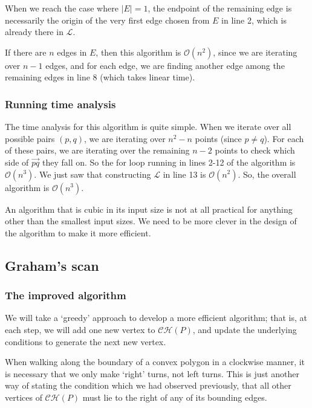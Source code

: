 \documentclass{article}
\begin{document}
When we reach the case where $\vert E \vert = 1$, the endpoint of the remaining edge is necessarily the origin of the very first edge chosen from $E$ in line 2, which is already there in $\mathcal{L}$.

If there are $n$ edges in $E$, then this algorithm is $\mathcal{O}(n^2)$, since we are iterating over $n-1$ edges, and for each edge, we are finding another edge among the remaining edges in line 8 (which takes linear time).

\subsubsection{Running time analysis}

The time analysis for this algorithm is quite simple. When we iterate over all possible pairs $(p,q)$, we are iterating over $n^2 - n$ points (since $p\neq q$). For each of these pairs, we are iterating over the remaining $n-2$ points to check which side of $\overrightarrow{pq}$ they fall on. So the for loop running in lines 2-12 of the algorithm is $\mathcal{O}(n^3)$. We just saw that constructing $\mathcal{L}$ in line 13 is $\mathcal{O}(n^2)$. So, the overall algorithm is $\mathcal{O}(n^3)$.

An algorithm that is cubic in its input size is not at all practical for anything other than the smallest input sizes. We need to be more clever in the design of the algorithm to make it more efficient.

\subsection{Graham's scan}

\subsubsection{The improved algorithm}

We will take a `greedy' approach to develop a more efficient algorithm; that is, at each step, we will add one new vertex to $\mathcal{CH}(P)$, and update the underlying conditions to generate the next new vertex.

When walking along the boundary of a convex polygon in a clockwise manner, it is necessary that we only make `right' turns, not left turns. This is just another way of stating the condition which we had observed previously, that all other vertices of $\mathcal{CH}(P)$ must lie to the right of any of its bounding edges.
\end{document}
